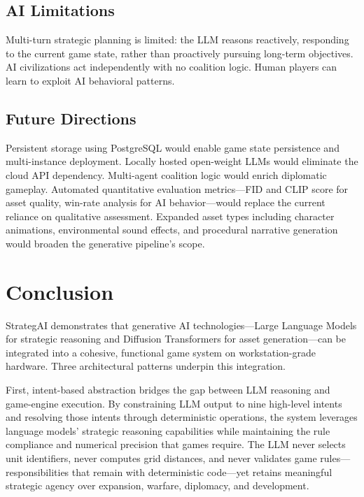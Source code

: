 \documentclass[conference]{IEEEtran}
\begin{document}
\subsection{AI Limitations}

Multi-turn strategic planning is limited: the LLM reasons reactively,
responding to the current game state, rather than proactively pursuing
long-term objectives. AI civilizations act independently with no coalition
logic. Human players can learn to exploit AI behavioral patterns.

\subsection{Future Directions}

Persistent storage using PostgreSQL would enable game state persistence and
multi-instance deployment. Locally hosted open-weight LLMs would eliminate
the cloud API dependency. Multi-agent coalition logic would enrich
diplomatic gameplay. Automated quantitative evaluation metrics---FID and
CLIP score for asset quality, win-rate analysis for AI behavior---would
replace the current reliance on qualitative assessment. Expanded asset
types including character animations, environmental sound effects, and
procedural narrative generation would broaden the generative pipeline's
scope.

\FloatBarrier
\section{Conclusion}
\label{sec:conclusion}

StrategAI demonstrates that generative AI technologies---Large Language
Models for strategic reasoning and Diffusion Transformers for asset
generation---can be integrated into a cohesive, functional game system on
workstation-grade hardware. Three architectural patterns underpin this
integration.

First, intent-based abstraction bridges the gap between LLM reasoning and
game-engine execution. By constraining LLM output to nine high-level
intents and resolving those intents through deterministic operations, the
system leverages language models' strategic reasoning capabilities while
maintaining the rule compliance and numerical precision that games require.
The LLM never selects unit identifiers, never computes grid distances, and
never validates game rules---responsibilities that remain with deterministic
code---yet retains meaningful strategic agency over expansion, warfare,
diplomacy, and development.
\end{document}
